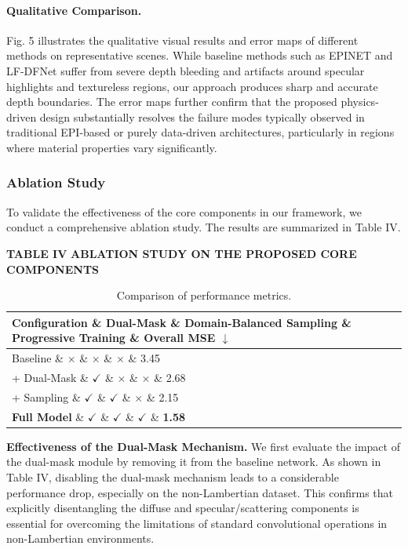 {\paragraph{Qualitative Comparison.}
Fig. 5 illustrates the qualitative visual results and error maps of different methods on representative scenes. While baseline methods such as EPINET and LF-DFNet suffer from severe depth bleeding and artifacts around specular highlights and textureless regions, our approach produces sharp and accurate depth boundaries. The error maps further confirm that the proposed physics-driven design substantially resolves the failure modes typically observed in traditional EPI-based or purely data-driven architectures, particularly in regions where material properties vary significantly.

\subsubsection{Ablation Study}

To validate the effectiveness of the core components in our framework, we conduct a comprehensive ablation study. The results are summarized in Table IV.

\textbf{TABLE IV}
\textbf{ABLATION STUDY ON THE PROPOSED CORE COMPONENTS}

\begin{table}[!t]
\caption{Comparison of performance metrics.}
\label{tab:comparison}
\centering
\begin{tabular*}{\linewidth}{@{\extracolsep{\fill}}lllll}
\toprule
Configuration \& Dual-Mask \& Domain-Balanced Sampling \& Progressive Training \& Overall MSE $\downarrow$ \\
\midrule
Baseline \& $\times$ \& $\times$ \& $\times$ \& 3.45 \\
+ Dual-Mask \& $\checkmark$ \& $\times$ \& $\times$ \& 2.68 \\
+ Sampling \& $\checkmark$ \& $\checkmark$ \& $\times$ \& 2.15 \\
\textbf{Full Model} \& $\checkmark$ \& $\checkmark$ \& $\checkmark$ \& \textbf{1.58} \\
\bottomrule
\end{tabular*}
\end{table}
\textbf{Effectiveness of the Dual-Mask Mechanism.}
We first evaluate the impact of the dual-mask module by removing it from the baseline network. As shown in Table IV, disabling the dual-mask mechanism leads to a considerable performance drop, especially on the non-Lambertian dataset. This confirms that explicitly disentangling the diffuse and specular/scattering components is essential for overcoming the limitations of standard convolutional operations in non-Lambertian environments.

}
